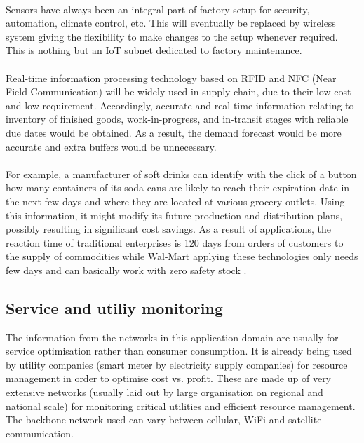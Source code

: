 \documentclass[10pt, twocolumn]{article}
\begin{document}
\paragraph{}
Sensors have always been an integral part of factory setup for security, automation, climate control, etc. This will eventually be replaced by wireless system giving the flexibility to make changes to the setup whenever required. This is nothing but an IoT subnet dedicated to factory maintenance.
\paragraph{}
Real-time information processing technology based on RFID and NFC (Near Field Communication) will be widely used in supply chain, due to their low cost and low requirement. Accordingly, accurate and real-time information relating to inventory of finished goods, work-in-progress, and in-transit stages with reliable due dates would be obtained. As a result, the demand forecast would be more accurate and extra buffers would be unnecessary.
\paragraph{}
For example, a manufacturer of soft drinks can identify with the click of a button how many containers of its soda cans are likely to reach their expiration date in the next few days and where they are located at various grocery outlets. Using this information, it might modify its future production and distribution plans, possibly resulting in significant cost savings. As a result of applications, the reaction time of traditional enterprises is 120 days from orders of customers to the supply of commodities while Wal-Mart applying these technologies only needs few days and can basically work with zero safety stock \cite{ref7}.
\subsection{Service and utiliy monitoring}
The information from the networks in this application domain are usually for service optimisation rather than consumer consumption. It is already being used by utility companies (smart meter by electricity supply companies) for resource management in order to optimise cost vs. profit. These are made up of very extensive networks (usually laid out by large organisation on regional and national scale) for monitoring critical utilities and efficient resource management. The backbone network used can vary between cellular, WiFi and satellite communication.
\end{document}
